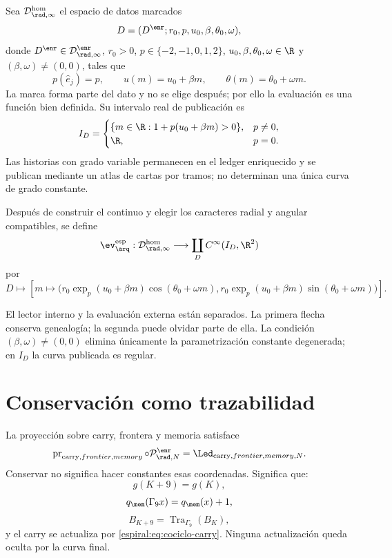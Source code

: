 \begin{definition}
Sea \(\mathcal D_{\rad,\infty}^{\mathrm{hom}}\) el espacio de datos marcados
\[
 D=(D^{\enr};r_0,p,u_0,\beta,\theta_0,\omega),
\]
donde \(D^{\enr}\in\mathcal D_{\rad,\infty}^{\enr}\), \(r_0>0\),
\(p\in\{-2,-1,0,1,2\}\), \(u_0,\beta,\theta_0,\omega\in\R\) y
\((\beta,\omega)\neq(0,0)\), tales que
\[
 p(\widehat e_j)=p,\qquad
 u(m)=u_0+\beta m,\qquad
 \theta(m)=\theta_0+\omega m.
\]
La marca forma parte del dato y no se elige después; por ello la evaluación
es una función bien definida.
Su intervalo real de publicación es
\[
 I_D=
 \begin{cases}
 \{m\in\R:1+p(u_0+\beta m)>0\},&p\neq0,\\
 \R,&p=0.
 \end{cases}
\]
Las historias con grado variable permanecen en el ledger enriquecido y se
publican mediante un atlas de cartas por tramos; no determinan una única
curva de grado constante.
\end{definition}

\begin{definition}
Después de construir el continuo y elegir los caracteres radial y angular
compatibles, se define
\[
 \ev_{\arq}^{\mathrm{esp}}:
 \mathcal D_{\rad,\infty}^{\mathrm{hom}}\longrightarrow
 \coprod_{D}C^\infty(I_D,\R^2)
\]
por
\[
 D\longmapsto
 \left[m\longmapsto
 \bigl(r_0\exp_{p}(u_0+\beta m)\cos(\theta_0+\omega m),
 r_0\exp_{p}(u_0+\beta m)\sin(\theta_0+\omega m)\bigr)\right].
\]
\end{definition}

El lector interno y la evaluación externa están separados. La primera
flecha conserva genealogía; la segunda puede olvidar parte de ella. La
condición \((\beta,\omega)\neq(0,0)\) elimina únicamente la parametrización
constante degenerada; en \(I_D\) la curva publicada es regular.

\section{Conservación como trazabilidad}

La proyección sobre carry, frontera y memoria satisface
\[
 \operatorname{pr}_{\mathrm{carry},frontier,memory}
 \circ\mathcal P_{\rad,N}^{\enr}
 =\Led_{{\mathrm{carry},frontier,memory},N}.
\]
Conservar no significa hacer constantes esas coordenadas. Significa que:
\[
 g(K+9)=g(K),
\]
\[
 q_{\mem}(\Gamma_9x)=q_{\mem}(x)+1,
\]
\[
 B_{K+9}=\operatorname{Tra}_{\Gamma_9}(B_K),
\]
y el carry se actualiza por \cref{espiral:eq:cociclo-carry}. Ninguna actualización
queda oculta por la curva final.

